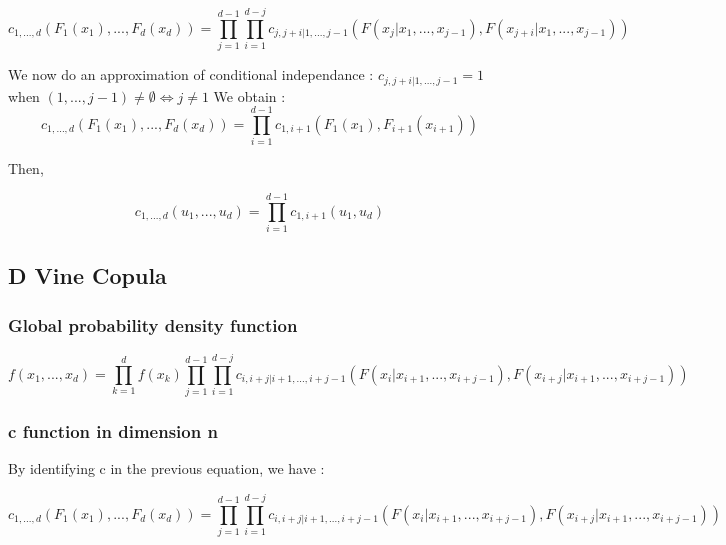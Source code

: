 \documentclass{article}
\begin{document}
	\begin{equation*}
		c_{1,...,d}(F_1(x_1),...,F_d(x_d))=  \prod_{j=1}^{d-1} \prod_{i=1}^{d-j} c_{j,j+i|1,...,j-1}(F(x_j|x_1,...,x_{j-1}),F(x_{j+i}|x_1,...,x_{j-1}))
	\end{equation*}

	We now do an approximation of conditional independance : \newline
	\begin{math} c_{j,j+i|1,...,j-1}=1 \end{math} when \begin{math} (1,...,j-1) \neq \emptyset \Leftrightarrow j \neq 1\end{math}
	\newline
	\newline
	We obtain :\newline
	\begin{equation*}
		c_{1,...,d}(F_1(x_1),...,F_d(x_d)) = \prod_{i=1}^{d-1} c_{1,i+1} (F_1(x_1),F_{i+1}(x_{i+1}))
	\end{equation*}

	Then,

	\begin{equation*}
		c_{1,...,d}(u_1,...,u_d) = \prod_{i=1}^{d-1} c_{1,i+1} (u_1,u_d)
	\end{equation*}

	\subsection{D Vine Copula}

	\subsubsection{Global probability density function}

	\begin{equation*}
		f(x_1,...,x_d)= \prod_{k=1}^d f(x_k) \prod_{j=1}^{d-1} \prod_{i=1}^{d-j} c_{i,i+j|i+1,...,i+j-1}(F(x_i|x_{i+1},...,x_{i+j-1}),F(x_{i+j}|x_{i+1},...,x_{i+j-1}))
	\end{equation*}

	\subsubsection{c function in dimension n}
	By identifying c in the previous equation, we have :

	\begin{equation*}
		c_{1,...,d}(F_1(x_1),...,F_d(x_d))= \prod_{j=1}^{d-1} \prod_{i=1}^{d-j} c_{i,i+j|i+1,...,i+j-1}(F(x_i|x_{i+1},...,x_{i+j-1}),F(x_{i+j}|x_{i+1},...,x_{i+j-1}))
	\end{equation*}
\end{document}

